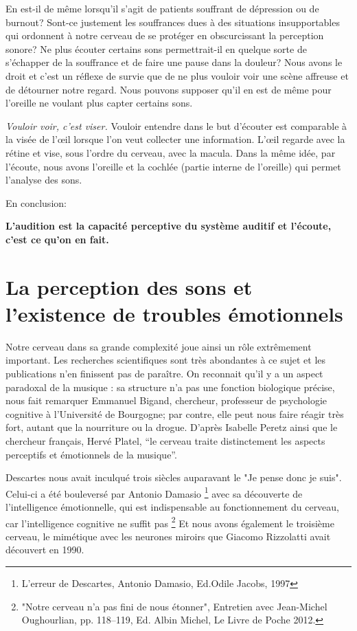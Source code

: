 En est-il de même lorsqu'il s'agit de patients souffrant de dépression
ou de burnout? Sont-ce justement les souffrances dues à des situations
insupportables qui
ordonnent à notre cerveau de se protéger en obscurcissant la
perception sonore?  Ne plus écouter certains
sons permettrait-il en quelque sorte de s'échapper de la souffrance et de faire une
pause dans la douleur? Nous avons le droit et c'est un réflexe de
survie que de ne plus vouloir voir une scène affreuse et de détourner
notre regard. Nous pouvons supposer qu'il en est de même pour l'oreille ne voulant plus capter
certains sons.


 \emph{Vouloir voir, c'est viser.}  Vouloir entendre dans le but d'écouter est comparable  à
la visée de l'\oe il lorsque l'on veut collecter une
information. L'\oe il regarde avec la rétine et  vise, sous l'ordre du
cerveau, avec la macula. Dans la même idée, par l'écoute, nous avons
l'oreille et la cochlée (partie interne de l'oreille) qui permet
l'analyse des sons.

En conclusion:


 \textbf{ L'audition est la capacité perceptive du système auditif et l'écoute, c'est ce qu'on en fait.}


\section{La perception des sons et l'existence de troubles
  émotionnels}


Notre cerveau  dans sa grande complexité joue ainsi un rôle extrêmement important.
Les recherches scientifiques sont très abondantes à ce sujet et les publications n'en finissent pas de paraître.
On reconnait qu'il y a un aspect paradoxal de la musique : sa structure n'a pas une 
fonction biologique précise, nous fait remarquer Emmanuel Bigand,  chercheur, professeur 
de psychologie cognitive à l'Université 
de Bourgogne; par contre, elle peut nous faire réagir très fort, autant que la nourriture ou la 
drogue. \autocite[Voir ch. 3 p. 35, "Vous avez l'oreille musicale"]{bigand:cerveau}
D'après Isabelle Peretz
\autocite[<<\,Les agnosies auditives\,>>, pp. 205--216]{seron.baron.ea:neuropsychologie}
ainsi que le chercheur français, Hervé Platel,%
\autocite[pp. 223--224]{platel_neuropsychology_2002}
 \enquote{le cerveau traite distinctement les aspects perceptifs et émotionnels de la 
 musique}.

Descartes nous avait inculqué trois siècles auparavant le "Je pense donc je suis". Celui-ci  a 
été bouleversé par Antonio Damasio \footnote {{L'erreur de Descartes}, Antonio Damasio, 
Ed.Odile Jacobs, 1997} 
avec sa découverte de l'intelligence émotionnelle, qui est indispensable au fonctionnement 
du 
cerveau, car  l'intelligence cognitive ne suffit pas%
\footnote{"Notre cerveau n'a pas fini de nous étonner", Entretien avec Jean-Michel 
     Oughourlian, pp. 118--119, Ed. Albin Michel, Le Livre de Poche 2012.}
Et nous avons  également le troisième cerveau, le mimétique avec les neurones miroirs que Giacomo Rizzolatti avait découvert en 1990.
 
